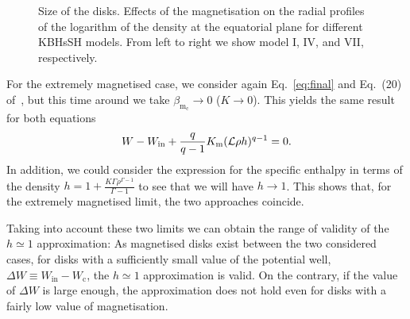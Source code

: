\documentclass[twocolumn,aps,showpacs,showkeys,prd,superscriptaddress,byrevtex, amsmath]{revtex4-1}
\begin{document}
\begin{figure}
\hspace{-0.6cm}
\caption{Size of the disks. Effects of the magnetisation on the radial profiles of the logarithm of the density at the equatorial plane for different KBHsSH models. From left to right we show model I, IV, and VII, respectively.}
\label{radial_profiles_HBH}
\end{figure}

For the extremely magnetised case, we consider again Eq.~\eqref{eq:final} and Eq.~(20) of~\cite{Gimeno-Soler:2017}, but this time around we take $\beta_{\mathrm{m_c}} \rightarrow 0$ ($K \rightarrow 0$). This yields the same result for both equations
\begin{equation}
W - W_{\mathrm{in}} + \frac{q}{q-1}K_{\rm m}(\mathcal{L}\rho h)^{q-1}=0.
\end{equation}
In addition, we could consider the expression for the specific enthalpy in terms of the density $h = 1 + \frac{K\Gamma\rho^{\Gamma-1}}{\Gamma - 1}$ to 
see that we will have $h \rightarrow 1$. This shows that, for the extremely magnetised limit, the two approaches coincide.

Taking into account these two limits we can obtain the range of validity of the $h \simeq 1$ approximation: As magnetised disks exist between the two considered cases, for disks with a sufficiently small value of the potential well, $\Delta W \equiv W_{\mathrm{in}} - W_{\mathrm{c}}$, the $h \simeq 1$ approximation is valid. On the contrary, if the value of $\Delta W$ is large enough, the approximation does not hold even for disks with a fairly low value of magnetisation.
\end{document}
